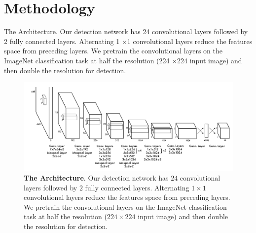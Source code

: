 \chapter[Methodology]{Methodology}

\regularsection
\headerregularsection

\updatemylof %
\updatemylot %

\begin{sloppypar} %

  The Architecture. Our detection network has 24 convolutional layers followed by 2 fully connected layers. Alternating 1 ×1 convolutional layers reduce the features space from preceding layers. We pretrain the convolutional layers on the ImageNet classification task at half the resolution (224 ×224 input image) and then double the resolution for detection.

\end{sloppypar}

\begin{figure}[H] %
  \centering
  \includegraphics[width=\textwidth]{figures/paper/layers.png}
  \caption[The Architecture]{\textbf{The Architecture}. Our detection network has $24$ convolutional layers followed by $2$ fully connected layers. Alternating $1 \times 1$ convolutional layers reduce the features space from preceding layers. We pretrain the convolutional layers on the ImageNet classification task at half the resolution ($224 \times 224$ input image) and then double the resolution for detection.}
  \label{fig:figures/paper-iv/fig-3}
\end{figure}




